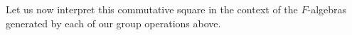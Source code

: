 
Let us now interpret this commutative square in the context of the $F$-algebras generated by each of our group operations above.







